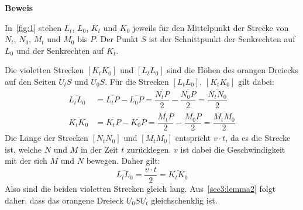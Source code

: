 \documentclass[10pt, a4paper]{amsart}
\makeatletter
\renewcommand\proofname{Beweis}
\renewenvironment{proof}[1][\proofname]{\par
\pushQED{\qed}%
\normalfont \topsep6\p@\@plus6\p@\relax
\trivlist
\item\relax
{\bfseries#1}\hspace\labelsep\ignorespaces
}{%
\popQED\endtrivlist\@endpefalse
}
\makeatother
\begin{document}
\begin{proof}
\begin{figure}[h]
    \caption{}
    \label{fig:1}
  \end{figure}
  In~\autoref{fig:1} stehen $L_t$, $L_0$, $K_t$ und $K_0$ jeweils für den
  Mittelpunkt der Strecke von $N_t$, $N_0$, $M_t$ und $M_0$ bis $P$. Der Punkt
  $S$ ist der Schnittpunkt der Senkrechten auf $L_0$ und der Senkrechten auf
  $K_t$.

  Die violetten Strecken $[K_tK_0]$ und $[L_tL_0]$ sind die Höhen des orangen
  Dreiecks auf den Seiten $U_tS$ und $U_0S$. Für die Strecken $[L_tL_0]$, $[K_tK_0]$ gilt dabei:
  \begin{align*}
    \overline{L_tL_0}&=\overline{L_tP}-\overline{L_0P}=\dfrac{\overline{N_tP}}{2} - \dfrac{\overline{N_0P}}{2} = \dfrac{\overline{N_tN_0}}{2}\\
    \overline{K_tK_0}&=\overline{K_tP}-\overline{K_0P}=\dfrac{\overline{M_tP}}{2} - \dfrac{\overline{M_0P}}{2} = \dfrac{\overline{M_tM_0}}{2}
  \end{align*}
  Die Länge der Strecken $[N_tN_0]$ und $[M_tM_0]$ entspricht $v\cdot t$, da es die
  Strecke ist, welche $N$ und $M$ in der Zeit $t$ zurücklegen. $v$ ist dabei die
  Geschwindigkeit mit der sich $M$ und $N$ bewegen. Daher gilt:
  \[\overline{L_tL_0} = \dfrac{v\cdot t}{2} = \overline{K_tK_0}\]
  Also sind die beiden violetten Strecken gleich lang. Aus~\autoref{sec3:lemma2}
  folgt daher, dass das orangene Dreieck $U_0SU_t$ gleichschenklig ist.


\end{proof}
\end{document}
